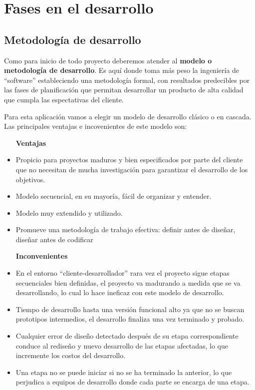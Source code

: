 \chapter{Fases en el desarrollo}

\section{Metodología de desarrollo}

Como para inicio de todo proyecto deberemos atender al \textbf{modelo o metodología de desarrollo}. Es aquí donde toma más peso la ingeniería de ``software''\cite{ing_software} estableciendo una metodología formal, con resultados predecibles por las fases de planificación que permitan desarrollar un producto de alta calidad que cumpla las espectativas del cliente. 

Para esta aplicación vamos a elegir un modelo de desarrollo clásico o en cascada\cite{modelo_desarrollo}. Las principales ventajas e incovenientes de este modelo son:

\begin{itemize}
\item [\textbf{Ventajas}]
\item Propicio para proyectos maduros y bien especificados por parte del cliente que no necesitan de mucha investigación para garantizar el desarrollo de los objetivos.
\item Modelo secuencial, en su mayoría, fácil de organizar y entender.
\item Modelo muy extendido y utilizado.
\item Promueve una metodología de trabajo efectiva: definir antes de diseñar, diseñar antes de codificar
\item [\textbf{Inconvenientes}]
\item En el entorno ``cliente-desarrollador'' rara vez el proyecto sigue etapas secuenciales bien definidas, el proyecto va madurando a medida que se va desarrollando, lo cual lo hace ineficaz con este modelo de desarrollo.
\item Tiempo de desarrollo hasta una versión funcional alto ya que no se buscan prototipos intermedios, el desarrollo finaliza una vez terminado y probado.
\item Cualquier error de diseño detectado después de su etapa correspondiente conduce al rediseño y nuevo desarrollo de las etapas afectadas, lo que incremente los costos del desarrollo.
\item Una etapa no se puede iniciar si no se ha terminado la anterior, lo que perjudica a equipos de desarrollo donde cada parte se encarga de una etapa.
\end{itemize}



